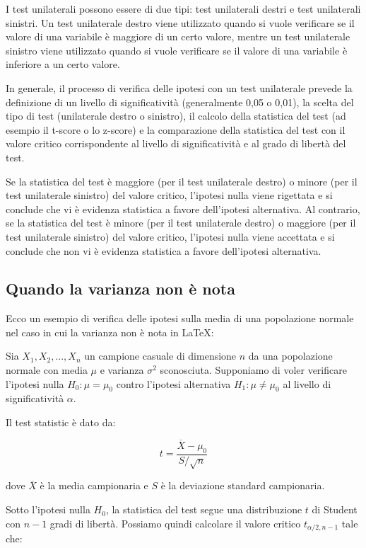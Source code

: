 I test unilaterali possono essere di due tipi: test unilaterali destri e test unilaterali sinistri. Un test unilaterale destro viene utilizzato quando si vuole verificare se il valore di una variabile è maggiore di un certo valore, mentre un test unilaterale sinistro viene utilizzato quando si vuole verificare se il valore di una variabile è inferiore a un certo valore.

In generale, il processo di verifica delle ipotesi con un test unilaterale prevede la definizione di un livello di significatività (generalmente 0,05 o 0,01), la scelta del tipo di test (unilaterale destro o sinistro), il calcolo della statistica del test (ad esempio il t-score o lo z-score) e la comparazione della statistica del test con il valore critico corrispondente al livello di significatività e al grado di libertà del test. 

Se la statistica del test è maggiore (per il test unilaterale destro) o minore (per il test unilaterale sinistro) del valore critico, l'ipotesi nulla viene rigettata e si conclude che vi è evidenza statistica a favore dell'ipotesi alternativa. Al contrario, se la statistica del test è minore (per il test unilaterale destro) o maggiore (per il test unilaterale sinistro) del valore critico, l'ipotesi nulla viene accettata e si conclude che non vi è evidenza statistica a favore dell'ipotesi alternativa.

\subsection{Quando la varianza non è nota}
Ecco un esempio di verifica delle ipotesi sulla media di una popolazione normale nel caso in cui la varianza non è nota in LaTeX:

Sia $X_1, X_2, ..., X_n$ un campione casuale di dimensione $n$ da una popolazione normale con media $\mu$ e varianza $\sigma^2$ sconosciuta. Supponiamo di voler verificare l'ipotesi nulla $H_0: \mu = \mu_0$ contro l'ipotesi alternativa $H_1: \mu \neq \mu_0$ al livello di significatività $\alpha$.

Il test statistic è dato da:

$$
t = \frac{\overline{X} - \mu_0}{S/\sqrt{n}}
$$

dove $\overline{X}$ è la media campionaria e $S$ è la deviazione standard campionaria.

Sotto l'ipotesi nulla $H_0$, la statistica del test segue una distribuzione $t$ di Student con $n-1$ gradi di libertà. Possiamo quindi calcolare il valore critico $t_{\alpha/2,n-1}$ tale che:

